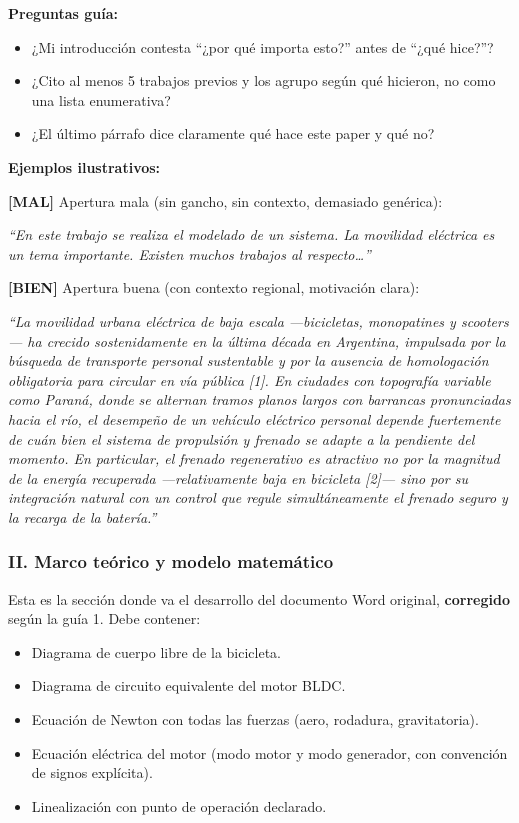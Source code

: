 \documentclass[11pt,a4paper]{article}
\newcommand{\malo}{\textcolor{red!70!black}{\textbf{[MAL]}}}
\newcommand{\bueno}{\textcolor{green!50!black}{\textbf{[BIEN]}}}
\begin{document}
\begin{guia}
\textbf{Preguntas guía:}
\begin{itemize}
    \item ¿Mi introducción contesta ``¿por qué importa esto?'' antes de ``¿qué hice?''?
    \item ¿Cito al menos 5 trabajos previos y los agrupo según qué hicieron, no como una lista enumerativa?
    \item ¿El último párrafo dice claramente qué hace este paper y qué no?
\end{itemize}
\end{guia}

\begin{ejemplo}
\textbf{Ejemplos ilustrativos:}

\malo{} Apertura mala (sin gancho, sin contexto, demasiado genérica):

\textit{``En este trabajo se realiza el modelado de un sistema. La movilidad eléctrica es un tema importante. Existen muchos trabajos al respecto\dots''}

\bueno{} Apertura buena (con contexto regional, motivación clara):

\textit{``La movilidad urbana eléctrica de baja escala ---bicicletas, monopatines y scooters--- ha crecido sostenidamente en la última década en Argentina, impulsada por la búsqueda de transporte personal sustentable y por la ausencia de homologación obligatoria para circular en vía pública [1]. En ciudades con topografía variable como Paraná, donde se alternan tramos planos largos con barrancas pronunciadas hacia el río, el desempeño de un vehículo eléctrico personal depende fuertemente de cuán bien el sistema de propulsión y frenado se adapte a la pendiente del momento. En particular, el frenado regenerativo es atractivo no por la magnitud de la energía recuperada ---relativamente baja en bicicleta [2]--- sino por su integración natural con un control que regule simultáneamente el frenado seguro y la recarga de la batería.''}
\end{ejemplo}

\subsubsection{II. Marco teórico y modelo matemático}

Esta es la sección donde va el desarrollo del documento Word original, \textbf{corregido} según la guía 1. Debe contener:

\begin{itemize}
    \item Diagrama de cuerpo libre de la bicicleta.
    \item Diagrama de circuito equivalente del motor BLDC.
    \item Ecuación de Newton con todas las fuerzas (aero, rodadura, gravitatoria).
    \item Ecuación eléctrica del motor (modo motor y modo generador, con convención de signos explícita).
    \item Linealización con punto de operación declarado.
\end{itemize}
\end{document}
